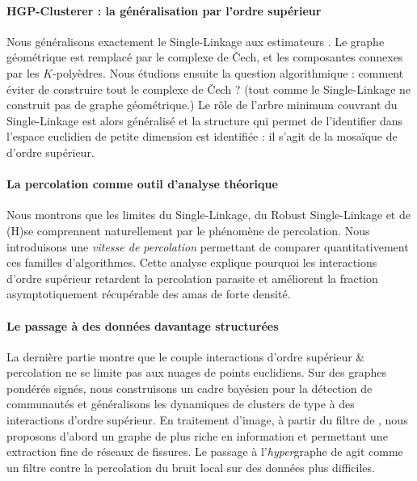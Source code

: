 \paragraph{HGP-Clusterer : la généralisation par l'ordre supérieur}
Nous généralisons exactement le Single-Linkage aux estimateurs \KNN.
Le graphe géométrique est remplacé par le complexe de \v{C}ech, et les composantes connexes par les $K$-polyèdres. 
Nous étudions ensuite la question algorithmique : comment éviter de construire tout le complexe de \v{C}ech ? (tout comme le Single-Linkage ne construit pas de graphe géométrique.)
Le rôle de l'arbre minimum couvrant du Single-Linkage est alors généralisé et la structure qui permet de l’identifier dans l'espace euclidien de petite dimension est identifiée : %
il s'agit de la mosaïque de  d'ordre supérieur.

\paragraph{La percolation comme outil d'analyse théorique}
Nous montrons que les limites du Single-Linkage, du Robust Single-Linkage et de (H)\DBSCAN se comprennent naturellement par le phénomène de percolation.
Nous introduisons une \emph{vitesse de percolation} permettant de comparer quantitativement ces familles d'algorithmes. 
Cette analyse explique pourquoi les interactions d'ordre supérieur retardent la percolation parasite et améliorent la fraction asymptotiquement récupérable des amas de forte densité.

\paragraph{Le passage à des données davantage structurées}
La dernière partie montre que le couple interactions d'ordre supérieur \& percolation ne se limite pas aux nuages de points euclidiens. 
Sur des graphes pondérés signés, nous construisons un cadre bayésien pour la détection de communautés et généralisons les dynamiques de clusters de type
 à des interactions d'ordre supérieur. 
En traitement d'image, à partir du filtre de , nous proposons d'abord un graphe de  plus riche en information et permettant une extraction fine de réseaux de fissures. Le passage à l'\emph{hyper}graphe de  agit comme un filtre contre la percolation du bruit local sur des données plus difficiles.

